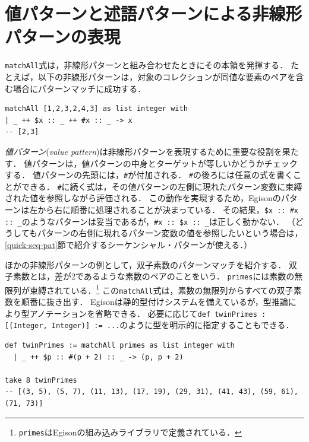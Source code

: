 \section{値パターンと述語パターンによる非線形パターンの表現}\label{quick-value-pat}

\lstinline{matchAll}式は，非線形パターンと組み合わせたときにその本領を発揮する．
たとえば，以下の非線形パターンは，対象のコレクションが同値な要素のペアを含む場合にパターンマッチに成功する．
\begin{lstlisting}[language=egison,numbers=none]
matchAll [1,2,3,2,4,3] as list integer with
| _ ++ $x :: _ ++ #x :: _ -> x
-- [2,3]
\end{lstlisting}

\emph{値パターン}(\emph{value pattern})は非線形パターンを表現するために重要な役割を果たす．
値パターンは，値パターンの中身とターゲットが等しいかどうかチェックする．
値パターンの先頭には，\lstinline{#}が付加される．
\lstinline{#}の後ろには任意の式を書くことができる．
\lstinline{#}に続く式は，その値パターンの左側に現れたパターン変数に束縛された値を参照しながら評価される．
この動作を実現するため，Egisonのパターンは左から右に順番に処理されることが決まっている．
その結果，\lstinline{$x :: #x :: _}のようなパターンは妥当であるが，\lstinline{#x :: $x :: _}は正しく動かない．
（どうしてもパターンの右側に現れるパターン変数の値を参照したいという場合は，\ref{quick-seq-pat}節で紹介するシーケンシャル・パターンが使える．）

ほかの非線形パターンの例として，双子素数のパターンマッチを紹介する．
双子素数とは，差が2であるような素数のペアのことをいう．
\lstinline{primes}には素数の無限列が束縛されている．\footnote{\lstinline{primes}はEgisonの組み込みライブラリで定義されている．}
この\lstinline{matchAll}式は，素数の無限列からすべての双子素数を順番に抜き出す．
Egisonは静的型付けシステムを備えているが，型推論により型アノテーションを省略できる．
必要に応じて\lstinline{def twinPrimes : [(Integer, Integer)] := ...}のように型を明示的に指定することもできる．
\begin{lstlisting}[language=egison,numbers=none]
def twinPrimes := matchAll primes as list integer with
  | _ ++ $p :: #(p + 2) :: _ -> (p, p + 2)

take 8 twinPrimes
-- [(3, 5), (5, 7), (11, 13), (17, 19), (29, 31), (41, 43), (59, 61), (71, 73)]
\end{lstlisting}


